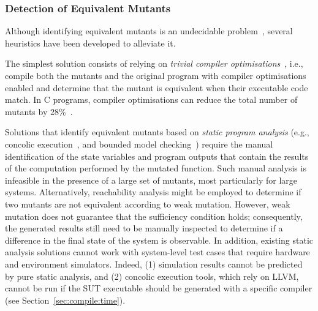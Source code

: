 \subsubsection{Detection of Equivalent Mutants}
\label{sec:background:equivalent}

Although identifying equivalent mutants is an undecidable problem~\cite{madeyski2013overcoming,Bugg:Correctness:82}, several heuristics have been developed to alleviate it. 

The simplest solution consists of relying on \emph{trivial compiler optimisations}~\cite{papadakis2015trivial, kintis2017detecting,papadakis2019mutation}, i.e., compile both the mutants and the original program with compiler optimisations enabled and determine that the mutant is equivalent when their executable code match. In C programs, compiler optimisations can reduce the total number of mutants by 28\%~\cite{kintis2017detecting}.



Solutions that identify equivalent mutants based on \emph{static program analysis} (e.g., concolic execution~\cite{holling2016nequivack}, and bounded model checking~\cite{riener2011test}) require the manual identification of the state variables and program outputs that contain the results of the computation performed by the mutated function.
Such manual analysis is infeasible in the presence of a large set of mutants, most particularly for large systems. 
Alternatively, reachability analysis might be employed to determine if two mutants are not equivalent according to weak mutation. 
However, weak mutation does not guarantee that the sufficiency condition holds; consequently, the generated results still need to be manually inspected to determine if a difference in the final state of the system is observable. In addition, existing static analysis solutions cannot work with system-level test cases that require hardware and environment simulators.
Indeed, (1) simulation results cannot be predicted by pure static analysis, and (2) concolic execution tools, which rely on LLVM, cannot be run if the SUT executable should be generated with a specific compiler (see Section~\ref{sec:compile:time}).

